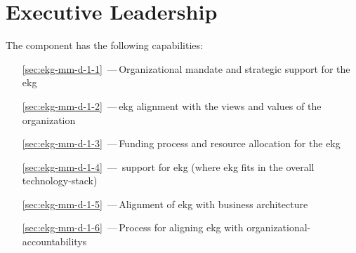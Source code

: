 \chapter{Executive Leadership}\label{ch:ekg-mm-d-1}

The  component has the following capabilities:

\begin{itemize}[leftmargin=.5in]
  \item [\ref{sec:ekg-mm-d-1-1}] \,---\,Organizational mandate and strategic support for the \gls{ekg}
  \item [\ref{sec:ekg-mm-d-1-2}] \,---\,\gls{ekg} alignment with the views and values of the organization
  \item [\ref{sec:ekg-mm-d-1-3}] \,---\,Funding process and resource allocation for the \gls{ekg}
  \item [\ref{sec:ekg-mm-d-1-4}] \,---\, support for \gls{ekg} (where \gls{ekg} fits in the overall \gls{technology-stack})
  \item [\ref{sec:ekg-mm-d-1-5}] \,---\,Alignment of \gls{ekg} with business architecture
  \item [\ref{sec:ekg-mm-d-1-6}] \,---\,Process for aligning \gls{ekg} with \glspl{organizational-accountability}
\end{itemize}







